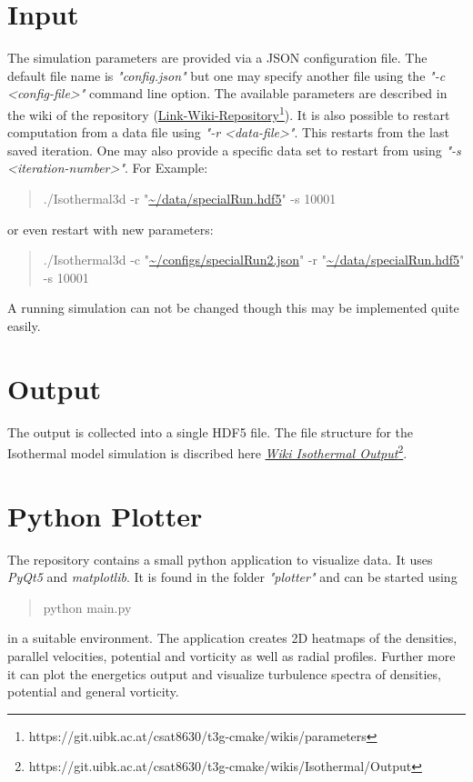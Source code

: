 \documentclass[master.tex]{subfiles}
\begin{document}
\section{Input}
The simulation parameters are provided via a \ac{JSON} configuration file. The default file name is \textit{"config.json"} but one may specify another file using the \textit{"-c <config-file>"} command line option. The available parameters are described in the wiki of the repository (\href{https://git.uibk.ac.at/csat8630/t3g-cmake/wikis/parameters}{Link-Wiki-Repository}\footnote{https://git.uibk.ac.at/csat8630/t3g-cmake/wikis/parameters}). It is also possible to restart computation from a data file using \textit{"-r <data-file>"}. This restarts from the last saved iteration. One may also provide a specific data set to restart from using \textit{"-s <iteration-number>"}. For Example:
\begin{quote}
    \small
./Isothermal3d -r "\url{~/data/specialRun.hdf5}" -s 10001
\end{quote}
or even restart with new parameters:
\begin{quote}
\small
      ./Isothermal3d -c "\url{~/configs/specialRun2.json}" -r "\url{~/data/specialRun.hdf5}" -s 10001  
\end{quote}
A running simulation can not be changed though this may be implemented quite easily.

\section{Output}
\label{sec:output}
The output is collected into a single \ac{HDF5} file. The file structure for the Isothermal model simulation is discribed here \textit{\href{https://git.uibk.ac.at/csat8630/t3g-cmake/wikis/Isothermal/Output}{Wiki Isothermal Output}}\footnote{https://git.uibk.ac.at/csat8630/t3g-cmake/wikis/Isothermal/Output}.

\section{Python Plotter}
The repository contains a small python application to visualize data. It uses \textit{PyQt5} and \textit{matplotlib}. It is found in the folder \textit{"plotter"} and can be started using
\begin{quote}
    python main.py
\end{quote}
in a suitable environment. The application creates 2D heatmaps of the densities, parallel velocities, potential and vorticity as well as radial profiles. Further more it can plot the energetics output and visualize turbulence spectra of densities, potential and general vorticity.
\end{document}
